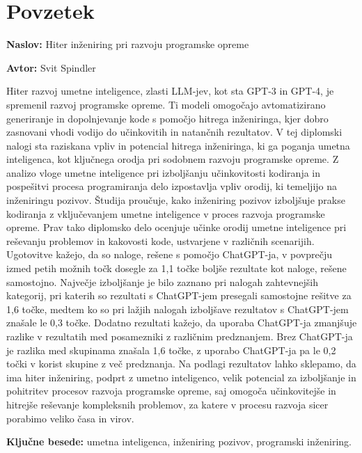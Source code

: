 \documentclass[a4paper,12pt,openright]{book}
\newcommand{\ttitle}{Hiter inženiring pri razvoju programske opreme}
\newcommand{\tauthor}{Svit Spindler}
\newcommand{\tkeywords}{umetna inteligenca, inženiring pozivov, programski inženiring}
\newcommand{\clearemptydoublepage}{\newpage{\pagestyle{empty}\cleardoublepage}}
\begin{document}
\clearemptydoublepage

{}
\chapter*{Povzetek}

\noindent\textbf{Naslov:} \ttitle
\bigskip

\noindent\textbf{Avtor:} \tauthor
\bigskip

Hiter razvoj umetne inteligence, zlasti LLM-jev, kot sta GPT-3 in GPT-4, je spremenil razvoj programske opreme. Ti modeli omogočajo avtomatizirano generiranje in dopolnjevanje kode s pomočjo hitrega inženiringa, kjer dobro zasnovani vhodi vodijo do učinkovitih in natančnih rezultatov. V tej diplomski nalogi sta raziskana vpliv in potencial hitrega inženiringa, ki ga poganja umetna inteligenca, kot ključnega orodja pri sodobnem razvoju programske opreme. Z analizo vloge umetne inteligence pri izboljšanju učinkovitosti kodiranja in pospešitvi procesa programiranja delo izpostavlja vpliv orodij, ki temeljijo na inženiringu pozivov. Študija proučuje, kako inženiring pozivov izboljšuje prakse kodiranja z vključevanjem umetne inteligence v proces razvoja programske opreme. Prav tako diplomsko delo ocenjuje učinke orodij umetne inteligence pri reševanju problemov in kakovosti kode, ustvarjene v različnih scenarijih. Ugotovitve kažejo, da so naloge, rešene s pomočjo ChatGPT-ja, v povprečju izmed petih možnih točk dosegle za 1,1 točke boljše rezultate kot naloge, rešene samostojno. Največje izboljšanje je bilo zaznano pri nalogah zahtevnejših kategorij, pri katerih so rezultati s ChatGPT-jem presegali samostojne rešitve za 1,6 točke, medtem ko so pri lažjih nalogah izboljšave rezultatov s ChatGPT-jem znašale le 0,3 točke. Dodatno rezultati kažejo, da uporaba ChatGPT-ja zmanjšuje razlike v rezultatih med posamezniki z različnim predznanjem. Brez ChatGPT-ja je razlika med skupinama znašala 1,6 točke, z uporabo ChatGPT-ja pa le 0,2 točki v korist skupine z več predznanja. Na podlagi rezultatov lahko sklepamo, da ima hiter inženiring, podprt z umetno inteligenco, velik potencial za izboljšanje in pohitritev procesov razvoja programske opreme, saj omogoča učinkovitejše in hitrejše reševanje kompleksnih problemov, za katere v procesu razvoja sicer porabimo veliko časa in virov.

\bigskip

\noindent\textbf{Ključne besede:} \tkeywords.
\clearemptydoublepage
\end{document}
